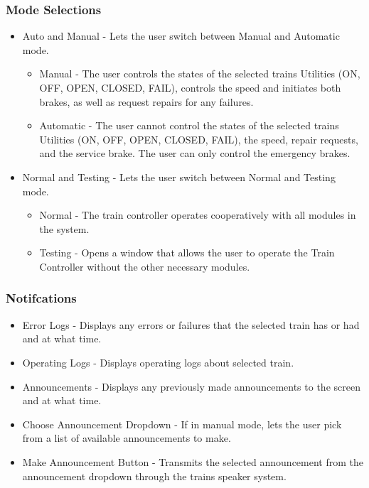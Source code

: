 \documentclass[letterpaper]{article}
\begin{document}
	\subsubsection{Mode Selections}
		\begin{itemize}
			\item Auto and Manual - Lets the user switch between Manual and Automatic mode. 
				\begin {itemize}
					\item Manual - The user controls the states of the selected trains Utilities (ON, OFF, OPEN, CLOSED, FAIL), controls the speed and initiates both brakes, as well as request repairs for any failures. 
					\item Automatic - The user cannot control the states of the selected trains Utilities (ON, OFF, OPEN, CLOSED, FAIL), the speed, repair requests, and the service brake. The user can only control the emergency brakes.
				\end{itemize}
			\item Normal and Testing - Lets the user switch between Normal and Testing mode. 
				\begin {itemize}
					\item Normal - The train controller operates cooperatively with all modules in the system. 
					\item Testing - Opens a window that allows the user to operate the Train Controller without the other necessary modules. 
				\end{itemize}
		\end{itemize}
	\subsubsection{Notifcations}
		\begin{itemize}
			\item Error Logs - Displays any errors or failures that the selected train has or had and at what time.
			\item Operating Logs - Displays operating logs about selected train.
			\item Announcements - Displays any previously made announcements to the screen and at what time. 
			\item Choose Announcement Dropdown - If in manual mode, lets the user pick from a list of available announcements to make. 
			\item Make Announcement Button - Transmits the selected announcement from the announcement dropdown through the trains speaker system. 
		\end{itemize}
\end{document}

